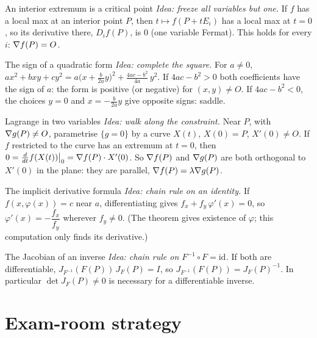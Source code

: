 \begin{proofbox}{An interior extremum is a critical point}
\emph{Idea: freeze all variables but one.} If $f$ has a local max at an interior point $P$, then
$t\mapsto f(P+tE_i)$ has a local max at $t=0$, so its derivative there, $D_if(P)$, is $0$ (one
variable Fermat). This holds for every $i$: $\nabla f(P)=O$.
\end{proofbox}

\begin{proofbox}{The sign of a quadratic form}
\emph{Idea: complete the square.} For $a\ne0$,
$ax^2+bxy+cy^2=a\Big(x+\tfrac b{2a}y\Big)^2+\tfrac{4ac-b^2}{4a}\,y^2.$
If $4ac-b^2>0$ both coefficients have the sign of $a$: the form is positive (or negative) for
$(x,y)\ne O$. If $4ac-b^2<0$, the choices $y=0$ and $x=-\frac b{2a}y$ give opposite signs: saddle.
\end{proofbox}

\begin{proofbox}{Lagrange in two variables}
\emph{Idea: walk along the constraint.} Near $P$, with $\nabla g(P)\ne O$, parametrise $\{g=0\}$ by
a curve $X(t)$, $X(0)=P$, $X'(0)\ne O$. If $f$ restricted to the curve has an extremum at $t=0$,
then $0=\frac{d}{dt}f(X(t))\big|_0=\nabla f(P)\cdot X'(0)$. So $\nabla f(P)$ and $\nabla g(P)$ are both
orthogonal to $X'(0)$ in the plane: they are parallel, $\nabla f(P)=\lambda\nabla g(P)$.
\end{proofbox}

\begin{proofbox}{The implicit derivative formula}
\emph{Idea: chain rule on an identity.} If $f(x,\varphi(x))=c$ near $a$, differentiating gives
$f_x+f_y\,\varphi'(x)=0$, so $\varphi'(x)=-\dfrac{f_x}{f_y}$ wherever $f_y\ne0$. (The theorem gives
existence of $\varphi$; this computation only finds its derivative.)
\end{proofbox}

\begin{proofbox}{The Jacobian of an inverse}
\emph{Idea: chain rule on $F^{-1}\circ F=\mathrm{id}$.} If both are differentiable,
$J_{F^{-1}}(F(P))\,J_F(P)=I$, so $J_{F^{-1}}(F(P))=J_F(P)^{-1}$. In particular $\det J_F(P)\ne0$ is
necessary for a differentiable inverse.
\end{proofbox}

\section{Exam-room strategy}

